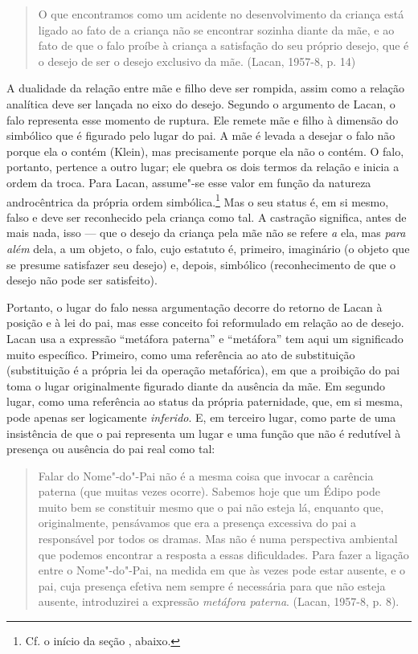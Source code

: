 \begin{quote}
O que encontramos como um acidente no desenvolvimento da criança está
ligado ao fato de a criança não se encontrar sozinha diante da mãe, e ao
fato de que o falo proíbe à criança a satisfação do seu próprio desejo,
que é o desejo de ser o desejo exclusivo da mãe. (Lacan, 1957-8, p. 14)
\end{quote}

A dualidade da relação entre mãe e filho deve ser rompida, assim como a
relação analítica deve ser lançada no eixo do desejo. Segundo o
argumento de Lacan, o falo representa esse momento de ruptura. Ele
remete mãe e filho à dimensão do simbólico que é figurado pelo lugar do
pai. A mãe é levada a desejar o falo não porque ela o contém (Klein),
mas precisamente porque ela não o contém. O falo, portanto, pertence a
outro lugar; ele quebra os dois termos da relação e inicia a ordem da
troca. Para Lacan, assume"-se esse valor em função da natureza
androcêntrica da própria ordem simbólica.\footnote{Cf. o início da seção
  , abaixo.} Mas o seu status é, em si mesmo, falso e deve ser
reconhecido pela criança como tal. A castração significa, antes de mais
nada, isso --- que o desejo da criança pela mãe não se refere \emph{a}
ela, mas \emph{para} \emph{além} dela, a um objeto, o falo, cujo
estatuto é, primeiro, imaginário (o objeto que se presume satisfazer seu
desejo) e, depois, simbólico (reconhecimento de que o desejo não pode
ser satisfeito).

Portanto, o lugar do falo nessa argumentação decorre do retorno de Lacan
à posição e à lei do pai, mas esse conceito foi reformulado em relação
ao de desejo. Lacan usa a expressão ``metáfora paterna'' e ``metáfora''
tem aqui um significado muito específico. Primeiro, como uma referência
ao ato de substituição (substituição é a própria lei da operação
metafórica), em que a proibição do pai toma o lugar originalmente
figurado diante da ausência da mãe. Em segundo lugar, como uma
referência ao status da própria paternidade, que, em si mesma, pode
apenas ser logicamente \emph{inferido}. E, em terceiro lugar, como parte
de uma insistência de que o pai representa um lugar e uma função que não
é redutível à presença ou ausência do pai real como tal:

\begin{quote}
Falar do Nome"-do"-Pai não é a mesma coisa que invocar a carência paterna
(que muitas vezes ocorre). Sabemos hoje que um Édipo pode muito bem se
constituir mesmo que o pai não esteja lá, enquanto que, originalmente,
pensávamos que era a presença excessiva do pai a responsável por todos
os dramas. Mas não é numa perspectiva ambiental que podemos encontrar a
resposta a essas dificuldades. Para fazer a ligação entre o Nome"-do"-Pai,
na medida em que às vezes pode estar ausente, e o pai, cuja presença
efetiva nem sempre é necessária para que não esteja ausente,
introduzirei a expressão \emph{metáfora paterna}. (Lacan, 1957-8, p. 8).
\end{quote}

